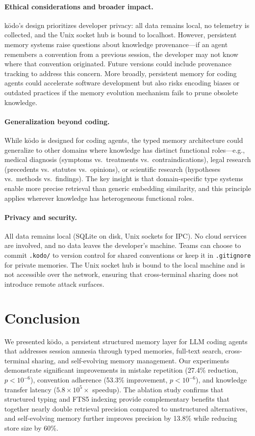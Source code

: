 \documentclass{article}
\begin{document}
\paragraph{Ethical considerations and broader impact.} k\=odo's design prioritizes developer privacy: all data remains local, no telemetry is collected, and the Unix socket hub is bound to localhost. However, persistent memory systems raise questions about knowledge provenance---if an agent remembers a convention from a previous session, the developer may not know where that convention originated. Future versions could include provenance tracking to address this concern. More broadly, persistent memory for coding agents could accelerate software development but also risks encoding biases or outdated practices if the memory evolution mechanism fails to prune obsolete knowledge.

\paragraph{Generalization beyond coding.} While k\=odo is designed for coding agents, the typed memory architecture could generalize to other domains where knowledge has distinct functional roles---e.g., medical diagnosis (symptoms vs.\ treatments vs.\ contraindications), legal research (precedents vs.\ statutes vs.\ opinions), or scientific research (hypotheses vs.\ methods vs.\ findings). The key insight is that domain-specific type systems enable more precise retrieval than generic embedding similarity, and this principle applies wherever knowledge has heterogeneous functional roles.

\paragraph{Privacy and security.} All data remains local (SQLite on disk, Unix sockets for IPC). No cloud services are involved, and no data leaves the developer's machine. Teams can choose to commit \texttt{.kodo/} to version control for shared conventions or keep it in \texttt{.gitignore} for private memories. The Unix socket hub is bound to the local machine and is not accessible over the network, ensuring that cross-terminal sharing does not introduce remote attack surfaces.

\section{Conclusion}

We presented k\=odo, a persistent structured memory layer for LLM coding agents that addresses session amnesia through typed memories, full-text search, cross-terminal sharing, and self-evolving memory management. Our experiments demonstrate significant improvements in mistake repetition (27.4\% reduction, $p < 10^{-6}$), convention adherence (53.3\% improvement, $p < 10^{-6}$), and knowledge transfer latency ($5.8 \times 10^5\times$ speedup). The ablation study confirms that structured typing and FTS5 indexing provide complementary benefits that together nearly double retrieval precision compared to unstructured alternatives, and self-evolving memory further improves precision by 13.8\% while reducing store size by 60\%.
\end{document}
